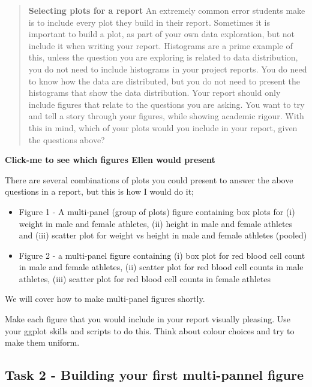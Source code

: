 \documentclass[
]{book}
\providecommand{\tightlist}{%
  \setlength{\itemsep}{0pt}\setlength{\parskip}{0pt}}
\begin{document}
\begin{quote}
\textbf{Selecting plots for a report}
An extremely common error students make is to include every plot they build in their report. Sometimes it is important to build a plot, as part of your own data exploration, but not include it when writing your report. Histograms are a prime example of this, unless the question you are exploring is related to data distribution, you do not need to include histograms in your project reports. You do need to know how the data are distributed, but you do not need to present the histograms that show the data distribution. Your report should only include figures that relate to the questions you are asking. You want to try and tell a story through your figures, while showing academic rigour. With this in mind, which of your plots would you include in your report, given the questions above?
\end{quote}

\textbf{Click-me to see which figures Ellen would present}

There are several combinations of plots you could present to answer the above questions in a report, but this is how I would do it;

\begin{itemize}
\tightlist
\item
  Figure 1 - A multi-panel (group of plots) figure containing box plots for (i) weight in male and female athletes, (ii) height in male and female athletes and (iii) scatter plot for weight vs height in male and female athletes (pooled)
\item
  Figure 2 - a multi-panel figure containing (i) box plot for red blood cell count in male and female athletes, (ii) scatter plot for red blood cell counts in male athletes, (iii) scatter plot for red blood cell counts in female athletes
\end{itemize}

We will cover how to make multi-panel figures shortly.

Make each figure that you would include in your report visually pleasing. Use your ggplot skills and scripts to do this. Think about colour choices and try to make them uniform.

\subsection{Task 2 - Building your first multi-pannel figure}\label{task-2---building-your-first-multi-pannel-figure}
\end{document}
